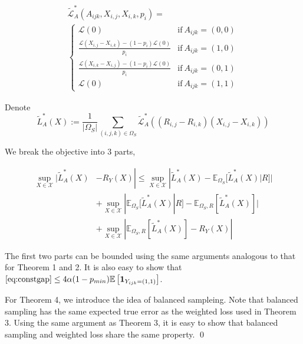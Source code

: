 \documentclass[conference]{IEEEtran}
\numberwithin{equation}{section}
\newcommand{\supX}{\sup_{X \in \mathcal{X}}}
\newcommand{\E}{\mathbb{E}}
\newtheorem{sampling strategy}{Sampling Strategy}
\begin{document}
\begin{equation}
    \begin{aligned}
        & \tilde{\mathcal{L}}^*_A(A_{ijk}, X_{i,j}, X_{i,k}, p_i) = & \\
        & \begin{cases}
             \mathcal{L}(0) & \text{if}~ A_{ijk} = (0,0) \\
             \frac{ \mathcal{L}(X_{i,j} - X_{i,k}) - (1-p_i) \mathcal{L}(0)  }{p_i} &  \text{if}~ A_{ijk} = (1,0) \\
             \frac{ \mathcal{L}(X_{i,k} - X_{i,j}) - (1-p_i) \mathcal{L}(0) }{p_i} &  \text{if}~ A_{ijk} = (0,1) \\
             \mathcal{L}(0) &  \text{if}~ A_{ijk} = (1,1)
        \end{cases}
    \end{aligned}
    \label{eq:modifiedloss}
\end{equation}

Denote 
$$\tilde{L}^*_A(X) := \frac{1}{|\Omega_S|} \sum_{(i,j,k) \in \Omega_S}  \tilde{\mathcal{L}}^*_A( (R_{i,j} - R_{i,k})(X_{i,j} - X_{i,k}) )$$

We break the objective into 3 parts, 

\begin{align}
    \supX  | \tilde{L}_A^*(X) & -  R_Y(X)|  \leq \supX | \tilde{L}_A^*(X) - \mathbb{E}_{\Omega_S} [\tilde{L}_A^*(X) | R] | \nonumber \\ 
    & + \supX |\mathbb{E}_{\Omega_S} [\tilde{L}_A^*(X) | R] - \mathbb{E}_{\Omega_S, R} [\tilde{L}_A^*(X)]| \nonumber \\
    & + \supX |\mathbb{E}_{\Omega_S, R} [\tilde{L}_A^*(X)] - R_Y(X) | \label{eq:constgap}
\end{align}

The first two parts can be bounded using the same arguments analogous to that for Theorem 1 and 2. It is also easy to show that $\ref{eq:constgap} \leq 4\alpha(1 - p_{min}) \E\left[ \bm{1}_{Y_{ijk} = (1,1)} \right]$.

For Theorem 4, we introduce the idea of balanced sampleing. Note that balanced sampling has the same expected true error as the weighted loss used in Theorem 3. Using the same argument as Theorem 3, it is easy to show that balanced sampling and weighted loss share the same property. \qed

\end{document}
